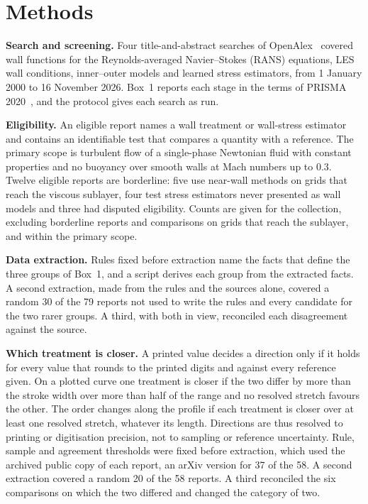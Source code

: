 \documentclass[pdflatex,sn-nature,iicol]{sn-jnl}
\begin{document}
\section{Methods}\label{sec:methods}
\textbf{Search and screening.} Four title-and-abstract searches of OpenAlex~\cite{Priem2022} covered wall functions for the Reynolds-averaged Navier--Stokes (RANS) equations, LES wall conditions, inner--outer models and learned stress estimators, from 1 January 2000 to 16 November 2026. Box~1 reports each stage in the terms of PRISMA 2020~\cite{Page2021}, and the protocol gives each search as run.

\textbf{Eligibility.} An eligible report names a wall treatment or wall-stress estimator and contains an identifiable test that compares a quantity with a reference. The primary scope is turbulent flow of a single-phase Newtonian fluid with constant properties and no buoyancy over smooth walls at Mach numbers up to 0.3. Twelve eligible reports are borderline: five use near-wall methods on grids that reach the viscous sublayer, four test stress estimators never presented as wall models and three had disputed eligibility. Counts are given for the collection, excluding borderline reports and comparisons on grids that reach the sublayer, and within the primary scope.

\textbf{Data extraction.} Rules fixed before extraction name the facts that define the three groups of Box~1, and a script derives each group from the extracted facts. A second extraction, made from the rules and the sources alone, covered a random 30 of the 79 reports not used to write the rules and every candidate for the two rarer groups. A third, with both in view, reconciled each disagreement against the source.

\textbf{Which treatment is closer.} A printed value decides a direction only if it holds for every value that rounds to the printed digits and against every reference given. On a plotted curve one treatment is closer if the two differ by more than the stroke width over more than half of the range and no resolved stretch favours the other. The order changes along the profile if each treatment is closer over at least one resolved stretch, whatever its length. Directions are thus resolved to printing or digitisation precision, not to sampling or reference uncertainty. Rule, sample and agreement thresholds were fixed before extraction, which used the archived public copy of each report, an arXiv version for 37 of the 58. A second extraction covered a random 20 of the 58 reports. A third reconciled the six comparisons on which the two differed and changed the category of two.
\end{document}
